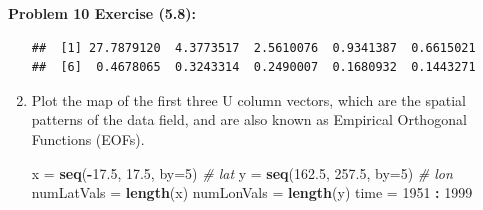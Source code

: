 \documentclass[11pt]{article}
\newenvironment{problem}[1]{\textbf{Problem #1: }}{\newpage}
\newenvironment{Shaded}{\begin{snugshade}}{\end{snugshade}}
\newcommand{\CommentTok}[1]{\textcolor[rgb]{0.56,0.35,0.01}{\textit{#1}}}
\newcommand{\ControlFlowTok}[1]{\textcolor[rgb]{0.13,0.29,0.53}{\textbf{#1}}}
\newcommand{\DataTypeTok}[1]{\textcolor[rgb]{0.13,0.29,0.53}{#1}}
\newcommand{\DecValTok}[1]{\textcolor[rgb]{0.00,0.00,0.81}{#1}}
\newcommand{\FloatTok}[1]{\textcolor[rgb]{0.00,0.00,0.81}{#1}}
\newcommand{\KeywordTok}[1]{\textcolor[rgb]{0.13,0.29,0.53}{\textbf{#1}}}
\newcommand{\NormalTok}[1]{#1}
\newcommand{\OperatorTok}[1]{\textcolor[rgb]{0.81,0.36,0.00}{\textbf{#1}}}
\newcommand{\StringTok}[1]{\textcolor[rgb]{0.31,0.60,0.02}{#1}}
\begin{document}
\begin{problem}{10 Exercise (5.8)}
\begin{enumerate}[label = (\alph*)]
\begin{Shaded}
\end{Shaded}

\begin{verbatim}
##  [1] 27.7879120  4.3773517  2.5610076  0.9341387  0.6615021  
##  [6]  0.4678065  0.3243314  0.2490007  0.1680932  0.1443271
\end{verbatim}

			\newpage
			\item Plot the map of the first three U column vectors, which are the spatial patterns of the
			data field, and are also known as Empirical Orthogonal Functions (EOFs).
			
\begin{Shaded}
\begin{Highlighting}[]
\NormalTok{x =}\StringTok{ }\KeywordTok{seq}\NormalTok{(}\OperatorTok{-}\FloatTok{17.5}\NormalTok{, }\FloatTok{17.5}\NormalTok{, }\DataTypeTok{by=}\DecValTok{5}\NormalTok{)  }\CommentTok{# lat}
\NormalTok{y =}\StringTok{ }\KeywordTok{seq}\NormalTok{(}\FloatTok{162.5}\NormalTok{, }\FloatTok{257.5}\NormalTok{, }\DataTypeTok{by=}\DecValTok{5}\NormalTok{) }\CommentTok{# lon}
\NormalTok{numLatVals =}\StringTok{ }\KeywordTok{length}\NormalTok{(x)}
\NormalTok{numLonVals =}\StringTok{ }\KeywordTok{length}\NormalTok{(y)}
\NormalTok{time =}\StringTok{ }\DecValTok{1951} \OperatorTok{:}\StringTok{ }\DecValTok{1999}


\end{Highlighting}
\end{Shaded}
\end{enumerate}
\end{problem}
\end{document}

